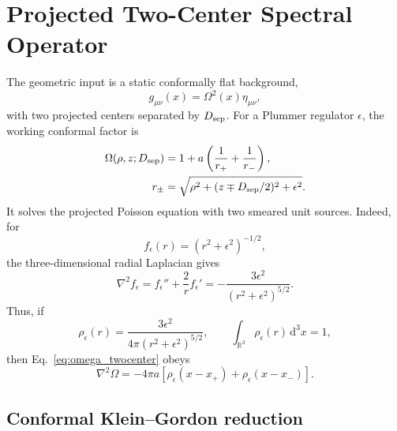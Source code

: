 \documentclass[pdflatex,sn-mathphys-num,iicol]{sn-jnl}
\newcommand{\dd}{\mathrm{d}}
\newcommand{\Dsep}{D_{\rm sep}}
\begin{document}
\section{Projected Two-Center Spectral Operator}
\label{sec:operator}

The geometric input is a static conformally flat background,
\begin{equation}
    g_{\mu\nu}(x)=\Omega^2(x)\eta_{\mu\nu},
\end{equation}
with two projected centers separated by \(\Dsep\).
For a Plummer regulator \(\epsilon\), the working conformal factor is
\begin{equation}
    \begin{aligned}
    \Omega(\rho,z;\Dsep)
    &=1+a\left(\frac{1}{r_+}+\frac{1}{r_-}\right),\\
    r_\pm
    &=\sqrt{\rho^2+(z\mp \Dsep/2)^2+\epsilon^2}.
    \end{aligned}
    \label{eq:omega_twocenter}
\end{equation}
It solves the projected Poisson equation with two smeared unit sources.
Indeed, for
\begin{equation}
    f_\epsilon(r)=(r^2+\epsilon^2)^{-1/2},
\end{equation}
the three-dimensional radial Laplacian gives
\begin{equation}
    \nabla^2 f_\epsilon
    =f_\epsilon''+\frac{2}{r}f_\epsilon'
    =-\frac{3\epsilon^2}{(r^2+\epsilon^2)^{5/2}}.
    \label{eq:plummer_laplacian}
\end{equation}
Thus, if
\begin{equation}
    \rho_\epsilon(r)=\frac{3\epsilon^2}{4\pi(r^2+\epsilon^2)^{5/2}},
    \qquad
    \int_{\mathbb R^3}\rho_\epsilon(r)\,\dd^3x=1,
\end{equation}
then Eq.~\eqref{eq:omega_twocenter} obeys
\begin{equation}
    \nabla^2\Omega
    =
    -4\pi a\left[
        \rho_\epsilon(x-x_+)+\rho_\epsilon(x-x_-)
    \right].
    \label{eq:projected_poisson}
\end{equation}

\subsection{Conformal Klein--Gordon reduction}
\end{document}
